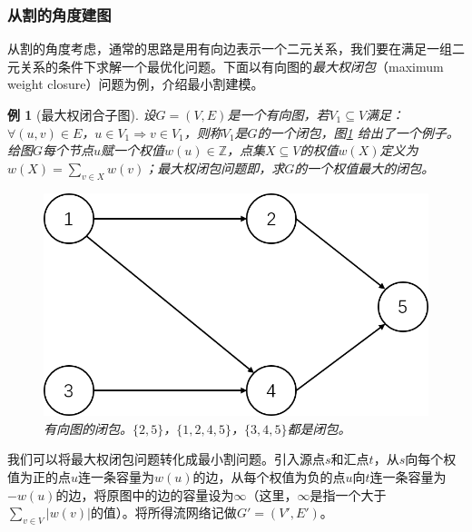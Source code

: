 \documentclass[a4paper]{ctexbook}
\newtheorem{example}{例}[chapter]
\begin{document}
  \subsubsection*{从割的角度建图}
  从割的角度考虑，通常的思路是用有向边表示一个二元关系，我们要在满足一组二元关系的条件下求解一个最优化问题。下面以有向图的\emph{最大权闭包}（maximum weight closure）问题为例，介绍最小割建模。
  \begin{example}[最大权闭合子图]
  设$G=(V,E)$是一个有向图，若$V_1\subseteq V$满足：$\forall (u,v) \in E$，$u\in V_1 \Rightarrow v\in V_1$，则称$V_1$是$G$的一个闭包，图\ref{Fig:closure} 给出了一个例子。给图$G$每个节点$u$赋一个权值$w(u)\in \mathbb{Z}$，点集$X\subseteq V$的权值$w(X)$定义为$w(X)=\sum_{v\in X}w(v)$；最大权闭包问题即，求$G$的一个权值最大的闭包。
  \begin{figure}
    \centering
    \includegraphics[scale=0.4]{figures/closure}
    \caption{有向图的闭包。$\{2,5\}$，$\{1,2,4,5\}$，$\{3,4,5\}$都是闭包。}
    \label{Fig:closure}
  \end{figure}
\end{example}
  我们可以将最大权闭包问题转化成最小割问题。引入源点$s$和汇点$t$，从$s$向每个权值为正的点$u$连一条容量为$w(u)$的边，从每个权值为负的点$u$向$t$连一条容量为$-w(u)$的边，将原图中的边的容量设为$\infty$（这里，$\infty$是指一个大于$\sum_{v\in V}|w(v)|$的值）。将所得流网络记做$G'=(V',E')$。
\end{document}
